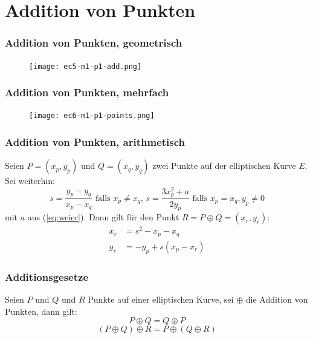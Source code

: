 \documentclass{beamer}
\begin{document}
\section{Addition von Punkten}
\begin{frame}
  \frametitle{Addition von Punkten, geometrisch}
  \begin{figure}
    \texttt{[image: ec5-m1-p1-add.png]}
  \end{figure}
\end{frame}

\begin{frame}
  \frametitle{Addition von Punkten, mehrfach}
  \begin{figure}
    \texttt{[image: ec6-m1-p1-points.png]}
  \end{figure}
\end{frame}

\begin{frame}
  \frametitle{Addition von Punkten, arithmetisch}
  \begin{theorem}[Additionsformel]
    Seien $P = (x_p, y_p)$ und $Q=(x_q, y_q)$ zwei Punkte auf der elliptischen
    Kurve $E$. Sei weiterhin:
    \begin{equation*}
      s = \frac{y_p - y_q}{x_p - x_q} \text{ falls } x_p \ne x_q \text{, }
      s = \frac{3x_p^2 + a}{2y_p} \text{ falls } x_p = x_q, y_p \ne 0
    \end{equation*}
    mit $a$ aus (\ref{eq:weier}).
    Dann gilt für den Punkt $R = P \oplus Q = (x_r, y_r)$:
    \begin{equation}
      \begin{split}  \label{ec:add}
        x_r & = s^2 - x_p - x_q \\
        y_r & = -y_p + s(x_p - x_r)
      \end{split}
    \end{equation}
  \end{theorem}
\end{frame}

\begin{frame}
  \frametitle{Additionsgesetze}
  Seien $P$ und $Q$ und $R$ Punkte auf einer elliptischen Kurve, sei $\oplus$
  die Addition von Punkten, dann gilt:
  \begin{equation}
    P \oplus Q = Q \oplus P
  \end{equation}
  \begin{equation}
    (P \oplus Q) \oplus R = P \oplus (Q \oplus R)
  \end{equation}
\end{frame}
\end{document}
